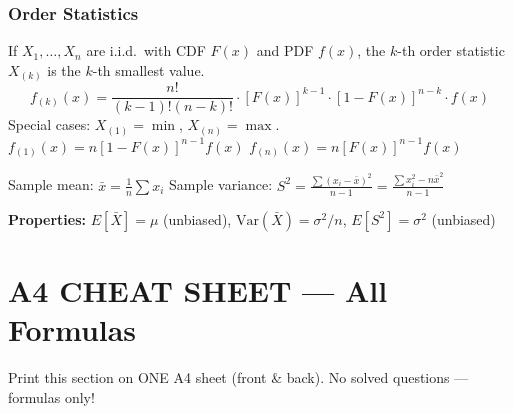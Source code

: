 \documentclass[11pt, letterpaper]{article}
\begin{document}
\subsubsection{Order Statistics}
If $X_1, \ldots, X_n$ are i.i.d.\ with CDF $F(x)$ and PDF $f(x)$, the $k$-th order statistic $X_{(k)}$ is the $k$-th smallest value.
\[ f_{(k)}(x) = \frac{n!}{(k-1)!(n-k)!} \cdot [F(x)]^{k-1} \cdot [1-F(x)]^{n-k} \cdot f(x) \]
Special cases: $X_{(1)} = \min$, $X_{(n)} = \max$.\\
$f_{(1)}(x) = n[1-F(x)]^{n-1} f(x)$ \qquad $f_{(n)}(x) = n[F(x)]^{n-1} f(x)$

\begin{formulabox}
Sample mean: $\bar{x} = \frac{1}{n} \sum x_i$ \qquad
Sample variance: $S^2 = \frac{\sum(x_i - \bar{x})^2}{n-1} = \frac{\sum x_i^2 - n\bar{x}^2}{n-1}$

\medskip
\textbf{Properties:} $E[\bar{X}] = \mu$ (unbiased), \quad $\text{Var}(\bar{X}) = \sigma^2/n$, \quad $E[S^2] = \sigma^2$ (unbiased)
\end{formulabox}

\newpage
\hypertarget{sec:cheat}{}
\section{A4 CHEAT SHEET --- All Formulas}
{\small\textcolor{orange!80!black}{Print this section on ONE A4 sheet (front \& back). No solved questions --- formulas only!}}
\end{document}
